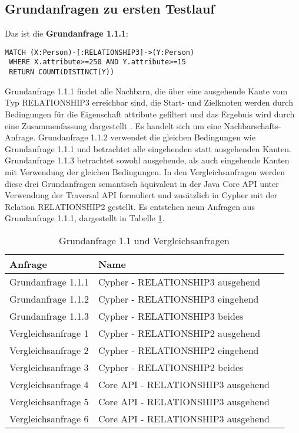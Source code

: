 \subsection{Grundanfragen zu ersten Testlauf}
Das ist die \textbf{Grundanfrage 1.1.1}: 
\begin{Verbatim}[frame=single]
 MATCH (X:Person)-[:RELATIONSHIP3]->(Y:Person) 
 WHERE X.attribute>=250 AND Y.attribute>=15  
 RETURN COUNT(DISTINCT(Y))
\end{Verbatim} 
Grundanfrage 1.1.1 findet alle Nachbarn, die über eine ausgehende Kante vom Typ RELATIONSHIP3 erreichbar sind, die Start- und Zielknoten werden durch Bedingungen für die Eigenschaft attribute  gefiltert und das Ergebnis wird durch eine Zusammenfassung dargestellt . Es handelt sich um eine Nachbarschafts-Anfrage.
 Grundanfrage 1.1.2 verwendet die gleichen Bedingungen wie Grundanfrage 1.1.1 und betrachtet alle eingehenden statt ausgehenden Kanten. Grundanfrage 1.1.3 betrachtet sowohl ausgehende, als auch eingehende Kanten mit Verwendung der gleichen Bedingungen. In den Vergleichsanfragen werden diese drei Grundanfragen semantisch äquivalent in der Java Core API unter Verwendung der Traversal API formuliert und zusätzlich in Cypher mit der Relation RELATIONSHIP2 gestellt. Es entstehen neun Anfragen aus Grundanfrage 1.1.1, dargestellt in Tabelle \ref{tab:Intro_Query2_1}.
\FloatBarrier
\begin{table}[h]
	\centering
	\begin{tabular}{ |p{5cm}||p{7cm}|p{3cm}  }
		\hline
		Anfrage& Name\\
		\hline
		Grundanfrage 1.1.1 &  Cypher - RELATIONSHIP3 ausgehend\\
		Grundanfrage 1.1.2 &  Cypher - RELATIONSHIP3 eingehend\\
		Grundanfrage 1.1.3 &  Cypher - RELATIONSHIP3 beides\\
		Vergleichsanfrage 1 &  Cypher - RELATIONSHIP2 ausgehend\\
		Vergleichsanfrage 2 &  Cypher - RELATIONSHIP2 eingehend\\
		Vergleichsanfrage 3 &  Cypher - RELATIONSHIP2 beides\\
		Vergleichsanfrage 4 &  Core API - RELATIONSHIP3 ausgehend\\
		Vergleichsanfrage 5 &  Core API - RELATIONSHIP3 ausgehend\\
		Vergleichsanfrage 6 &  Core API - RELATIONSHIP3 ausgehend\\
		\hline
	\end{tabular}
	\caption{Grundanfrage 1.1 und Vergleichsanfragen}
	\label{tab:Intro_Query2_1}
\end{table}
\FloatBarrier

